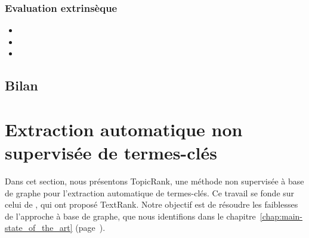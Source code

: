       \subsubsection{Evaluation extrinsèque}
      \label{subsubsec:main-automatic_keyphrase_annotation-keyphrase_candidate_selection-evaluation-extrinsic_evaluation}
      \begin{itemize}
        \item{}
        \item{}
        \item{}
      \end{itemize}

    \subsection{Bilan}
    \label{subsec:main-automatic_keyphrase_annotation-keyphrase_candidate_selection-conclusion}


  \section{Extraction automatique non supervisée de termes-clés}
  \label{sec:main-automatic_keyphrase_annotation-unsupervised_automatic_keyphrase_extraction}
    Dans cet section, nous présentons TopicRank, une méthode non supervisée à
    base de graphe pour l'extraction automatique de termes-clés. Ce travail se
    fonde sur celui de , qui ont proposé TextRank.
    Notre objectif est de résoudre les faiblesses de l'approche à base de
    graphe, que nous identifions dans le
    chapitre~\ref{chap:main-state_of_the_art}
    (page~\pageref{chap:main-state_of_the_art}).

